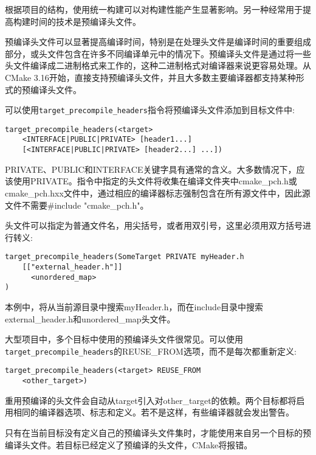 根据项目的结构，使用统一构建可以对构建性能产生显著影响。另一种经常用于提高构建时间的技术是预编译头文件。


预编译头文件可以显著提高编译时间，特别是在处理头文件是编译时间的重要组成部分，或头文件包含在许多不同编译单元中的情况下。预编译头文件是通过将一些头文件编译成二进制格式来工作的，这种二进制格式对编译器来说更容易处理。从CMake 3.16开始，直接支持预编译头文件，并且大多数主要编译器都支持某种形式的预编译头文件。

可以使用\texttt{target\_precompile\_headers}指令将预编译头文件添加到目标文件中:

\begin{lstlisting}[style=styleCMake]
target_precompile_headers(<target>
	<INTERFACE|PUBLIC|PRIVATE> [header1...]
	[<INTERFACE|PUBLIC|PRIVATE> [header2...] ...])
\end{lstlisting}

PRIVATE、PUBLIC和INTERFACE关键字具有通常的含义。大多数情况下，应该使用PRIVATE。指令中指定的头文件将收集在编译文件夹中cmake\_pch.h或cmake\_pch.hxx文件中，通过相应的编译器标志强制包含在所有源文件中，因此源文件不需要\#include "cmake\_pch.h"。

头文件可以指定为普通文件名，用尖括号，或者用双引号，这里必须用双方括号进行转义:

\begin{lstlisting}[style=styleCMake]
target_precompile_headers(SomeTarget PRIVATE myHeader.h
	[["external_header.h"]]
	  <unordered_map>
)
\end{lstlisting}

本例中，将从当前源目录中搜索myHeader.h，而在include目录中搜索external\_header.h和unordered\_map头文件。

大型项目中，多个目标中使用的预编译头文件很常见。可以使用\texttt{target\_precompile\_headers}的REUSE\_FROM选项，而不是每次都重新定义:

\begin{lstlisting}[style=styleCMake]
target_precompile_headers(<target> REUSE_FROM
	<other_target>)
\end{lstlisting}

重用预编译的头文件会自动从target引入对other\_target的依赖。两个目标都将启用相同的编译器选项、标志和定义。若不是这样，有些编译器就会发出警告。

只有在当前目标没有定义自己的预编译头文件集时，才能使用来自另一个目标的预编译头文件。若目标已经定义了预编译的头文件，CMake将报错。

